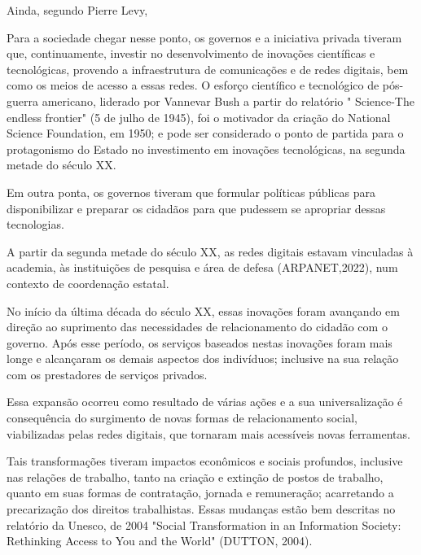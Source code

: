 Ainda, segundo Pierre Levy,


\noindent\begin{flushright}\mbox{\linespread{1}\selectfont\centering{}}\end{flushright}


Para a sociedade chegar nesse ponto, os governos e a iniciativa privada tiveram que, continuamente, investir no desenvolvimento de inovações científicas e tecnológicas, provendo a infraestrutura de comunicações e de redes digitais, bem como os meios de acesso a essas redes. O esforço científico e tecnológico de pós-guerra americano, liderado por Vannevar Bush a partir do relatório " Science-The endless frontier" (5 de julho de 1945), foi o motivador da criação do National Science Foundation, em 1950; e pode ser considerado  o ponto de partida para o protagonismo do Estado no investimento em inovações tecnológicas, na segunda metade do século XX.

Em outra ponta, os governos tiveram que formular políticas públicas para disponibilizar e preparar os cidadãos para que pudessem se apropriar dessas tecnologias.

A partir da segunda metade do século XX, as redes digitais estavam vinculadas à academia, às instituições de pesquisa e área de defesa (ARPANET,2022), num contexto de coordenação estatal.

No início da última década do século XX, essas inovações  foram avançando em direção ao suprimento das necessidades de relacionamento do cidadão com o governo. Após esse período, os serviços baseados nestas inovações foram mais longe e alcançaram  os demais aspectos dos indivíduos; inclusive na sua relação com os prestadores de serviços privados.

Essa expansão ocorreu como resultado de várias ações e a sua universalização é consequência do surgimento de novas formas de relacionamento social, viabilizadas pelas redes digitais, que tornaram mais acessíveis novas ferramentas.

Tais transformações tiveram impactos econômicos e sociais profundos, inclusive nas relações de trabalho, tanto na criação e extinção de postos de trabalho,  quanto em suas formas de contratação, jornada e remuneração; acarretando a precarização dos direitos trabalhistas. Essas mudanças estão bem descritas  no relatório da Unesco,  de 2004 "Social Transformation in an Information Society: Rethinking Access to You and the World" (DUTTON, 2004).

